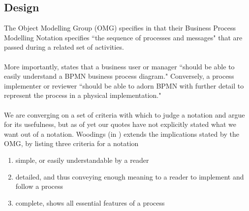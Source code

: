 \subsection{Design}

The Object Modelling Group (OMG) specifies in \cite{bpmnfaq} that their Business Process Modelling Notation
specifies ``the sequence of processes and messages" that are passed during a related set of
activities.\\
\\
More importantly, \cite{bpmnfaq} states that a business user or manager ``should be able to easily
understand a BPMN business process diagram."
Conversely, a process implementer or reviewer ``should be able to adorn BPMN with further detail to
represent the process in a physical implementation."\\
\\
We are converging on a set of criteria with which to judge a notation and argue for its usefulness,
but as of yet our quotes have not explicitly stated what we want out of a notation.
Woodings (in \cite{Woodings2013Tut1}) extends the implications stated by the OMG, by listing three criteria for a notation
\begin{enumerate}
	\item simple, or easily understandable by a reader \label{simpleNot}
	\item detailed, and thus conveying enough meaning to a reader to implement and follow
	a process \label{detailedNot}
	\item complete, shows all essential features of a process \label{completeNot}
\end{enumerate}

